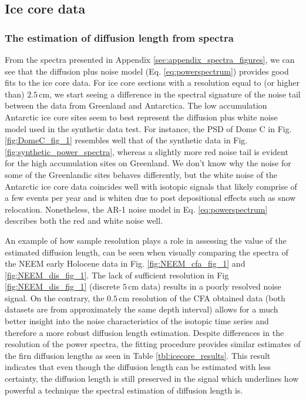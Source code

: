 \documentclass[11pt, draftcls, onecolumn]{IEEEtran} %
\numberwithin{equation}{section}
\numberwithin{table}{section}
\numberwithin{figure}{section}
\begin{document}
\subsection{Ice core data}\label{sec:discussion_icecore}

\subsubsection{The estimation of diffusion length from spectra}

From the spectra presented in Appendix \ref{sec:appendix_spectra_figures}, 
we can see that the diffusion plus noise model (Eq. \ref{eq:powerspectrum}) provides good fits to the ice core data. 
For ice core sections with a resolution equal to (or higher than) $2.5\,\mathrm{cm}$, 
we start seeing a difference in the spectral signature of the noise tail between the data from Greenland and Antarctica.
The low accumulation Antarctic ice core sites seem to best represent the diffusion plus white noise model
used in the synthetic data test.
For instance, the PSD of Dome C in Fig. \ref{fig:DomeC_fig_1} resembles well that of the synthetic data
in Fig. \ref{fig:synthetic_power_spectra},
whereas a slightly more red noise tail is evident for the high accumulation sites on Greenland. 
We don't know why the noise for some of the Greenlandic sites behaves differently, 
but the white noise of the Antarctic ice core data coincides well
with isotopic signals that likely comprise of a few events per year and
is whiten due to post depositional effects such as snow relocation. 
Nonetheless, the AR-1 noise model in Eq. \ref{eq:powerspectrum} describes both the red and white noise well.

An example of how sample resolution plays a role in assessing the value of the estimated diffusion length, 
can be seen when visually comparing the spectra of the NEEM early Holocene data in Fig. \ref{fig:NEEM_cfa_fig_1} and \ref{fig:NEEM_dis_fig_1}. 
The lack of sufficient resolution in Fig \ref{fig:NEEM_dis_fig_1} (discrete $5\,\mathrm{cm}$ data) results in a poorly resolved noise signal. 
On the contrary, the $0.5\,\mathrm{cm}$ resolution of the CFA obtained data (both datasets are from approximately the same depth interval) 
allows for a much better insight into the noise characteristics of the isotopic time series and therefore a more robust diffusion length estimation.
Despite differences in the resolution of the power spectra,
the fitting procedure provides similar estimates of the firn diffusion lengths as seen in Table \ref{tbl:icecore_results}.
This result indicates that even though the diffusion length can be estimated with less certainty,
the diffusion length is still preserved in the signal which underlines how powerful a technique the spectral estimation of diffusion length is.
\end{document}
